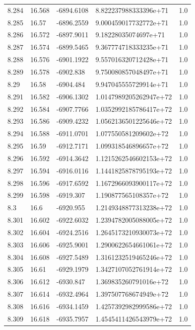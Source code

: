 \begin{tabular}{lllll}
8.284 & 16.568 & -6894.6108 & 8.822237988333396e+71 & 1.0 \\
8.285 & 16.57 & -6896.2559 & 9.000459017732772e+71 & 1.0 \\
8.286 & 16.572 & -6897.9011 & 9.18228035074697e+71 & 1.0 \\
8.287 & 16.574 & -6899.5465 & 9.367774718333235e+71 & 1.0 \\
8.288 & 16.576 & -6901.1922 & 9.557016320712428e+71 & 1.0 \\
8.289 & 16.578 & -6902.838 & 9.750080857048497e+71 & 1.0 \\
8.29 & 16.58 & -6904.484 & 9.947045555729914e+71 & 1.0 \\
8.291 & 16.582 & -6906.1302 & 1.0147989205262947e+72 & 1.0 \\
8.292 & 16.584 & -6907.7766 & 1.0352992185786417e+72 & 1.0 \\
8.293 & 16.586 & -6909.4232 & 1.0562136501225646e+72 & 1.0 \\
8.294 & 16.588 & -6911.0701 & 1.077550581209602e+72 & 1.0 \\
8.295 & 16.59 & -6912.7171 & 1.099318546896657e+72 & 1.0 \\
8.296 & 16.592 & -6914.3642 & 1.1215262546602153e+72 & 1.0 \\
8.297 & 16.594 & -6916.0116 & 1.1441825878795193e+72 & 1.0 \\
8.298 & 16.596 & -6917.6592 & 1.1672966093900117e+72 & 1.0 \\
8.299 & 16.598 & -6919.307 & 1.190877565108357e+72 & 1.0 \\
8.3 & 16.6 & -6920.955 & 1.2149348877313238e+72 & 1.0 \\
8.301 & 16.602 & -6922.6032 & 1.2394782005088005e+72 & 1.0 \\
8.302 & 16.604 & -6924.2516 & 1.2645173210930073e+72 & 1.0 \\
8.303 & 16.606 & -6925.9001 & 1.2900622654661061e+72 & 1.0 \\
8.304 & 16.608 & -6927.5489 & 1.3161232519465246e+72 & 1.0 \\
8.305 & 16.61 & -6929.1979 & 1.3427107052761914e+72 & 1.0 \\
8.306 & 16.612 & -6930.847 & 1.369835260791016e+72 & 1.0 \\
8.307 & 16.614 & -6932.4964 & 1.397507768674949e+72 & 1.0 \\
8.308 & 16.616 & -6934.1459 & 1.4257392982999586e+72 & 1.0 \\
8.309 & 16.618 & -6935.7957 & 1.4545411426543979e+72 & 1.0 \\

\end{tabular}
